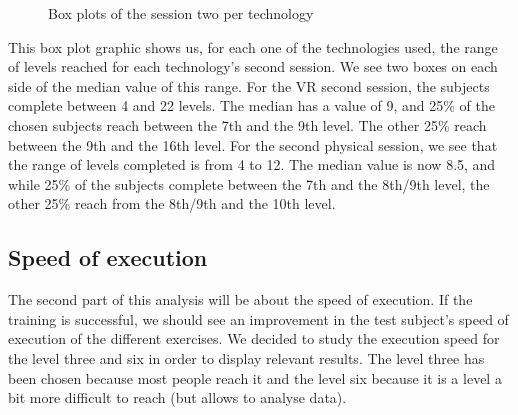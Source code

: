 \documentclass[12pt, openany, twocolumn]{article}
\begin{document}
                \begin{figure}[H]
                    \setlength{\fboxsep}{0pt}
                    \setlength{\fboxrule}{1pt}
                    \caption{Box plots of the session two per technology}
                \end{figure}

            This box plot graphic shows us, for each one of the technologies used, the range of levels reached for each technology's second session. We see two boxes on each side of the median value of this range.
            For the VR second session, the subjects complete between 4 and 22 levels. The median has a value of 9, and 25\% of the chosen subjects reach between the 7th and the 9th level. The other 25\% reach between the 9th and the 16th level.
            For the second physical session, we see that the range of levels completed is from 4 to 12. The median value is now 8.5, and while 25\% of the subjects complete between the 7th and the 8th/9th level, the other 25\% reach from the 8th/9th and the 10th level.

    \subsection{Speed of execution}
    The second part of this analysis will be about the speed of execution.
    If the training is successful, we should see an improvement in the test subject's speed of execution of the different exercises. We decided to study the execution speed for the level three and six in order to display relevant results. The level three has been chosen because most people reach it and the level six because it is a level a bit more difficult to reach (but allows to analyse data). 
\end{document}
